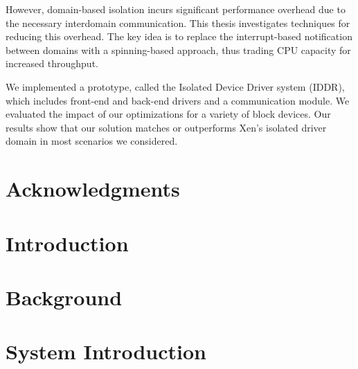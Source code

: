 \documentclass[12pt]{report}
\begin{document}
However, domain-based isolation incurs significant performance overhead
due to the necessary interdomain communication.
This thesis investigates techniques for reducing this overhead.
The key idea is to replace the interrupt-based notification
between domains with a spinning-based approach, thus trading
CPU capacity for increased throughput.

We implemented a prototype, called the Isolated Device Driver system (IDDR),
which includes front-end and back-end drivers and a communication module.
We evaluated the impact of our optimizations for a variety of block devices.
Our results show that our solution matches or outperforms Xen's isolated 
driver domain in most scenarios we considered.
\vfill

\pagebreak

\chapter*{Acknowledgments}


\tableofcontents
\pagebreak

\listoffigures
\pagebreak

\listoftables
\pagebreak

\pagestyle{myheadings}


\chapter{Introduction} 



\chapter{Background}  



\chapter{System Introduction}


\end{document}
